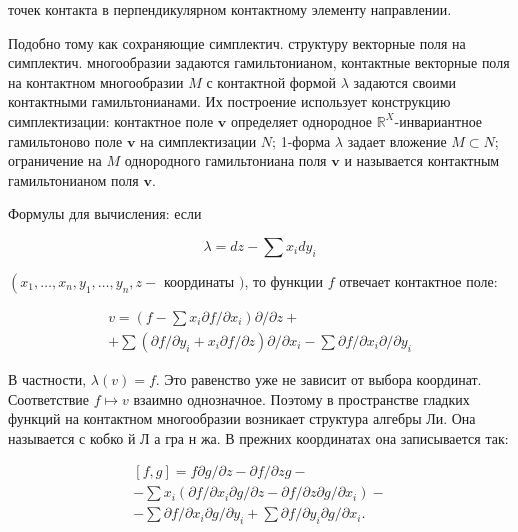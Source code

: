 \documentclass[10pt]{article}
\begin{document}
точек контакта в перпендикулярном контактному элементу направлении.



Подобно тому как сохраняющие симплектич. структуру векторные поля на симплектич. многообразии задаются гамильтонианом, контактные векторные поля на контактном многообразии $M$ с контактной формой $\lambda$ задаются своими контактными гамильтонианами. Их построение использует конструкцию симплектизации: контактное поле $\boldsymbol{v}$ определяет однородное $\mathbb{R}^{X}$-инвариантное гамильтоново поле $\boldsymbol{v}$ на симплектизации $N$; 1-форма $\lambda$ задает вложение $M \subset N$; ограничение на $M$ однородного гамильтониана поля $\boldsymbol{v}$ и называется контактным гамильтонианом поля $\boldsymbol{v}$.



Формулы для вычисления: если



\[

\lambda=d z-\sum x_{i} d y_{i}

\]



$\left(x_{1}, \ldots, x_{n}, y_{1}, \ldots, y_{n}, z-\right.$ координаты $)$, то функции $f$ отвечает контактное поле:



\[

\begin{gathered}

v=\left(f-\sum x_{i} \partial f / \partial x_{i}\right) \partial / \partial z+ \\

+\sum\left(\partial f / \partial y_{i}+x_{i} \partial f / \partial z\right) \partial / \partial x_{i}-\sum \partial f / \partial x_{i} \partial / \partial y_{i}

\end{gathered}

\]



В частности, $\lambda(v)=f$. Это равенство уже не зависит от выбора координат. Соответствие $f \mapsto v$ взаимно однозначное. Поэтому в пространстве гладких функций на контактном многообразии возникает структура алгебры Ли. Она называется с кобко й Л а гра н жа. В прежних координатах она записывается так:



\[

\begin{gathered}

{[f, g]=f \partial g / \partial z-\partial f / \partial z g-} \\

-\sum x_{i}\left(\partial f / \partial x_{i} \partial g / \partial z-\partial f / \partial z \partial g / \partial x_{i}\right)- \\

-\sum \partial f / \partial x_{i} \partial g / \partial y_{i}+\sum \partial f / \partial y_{i} \partial g / \partial x_{i} .

\end{gathered}

\]
\end{document}
